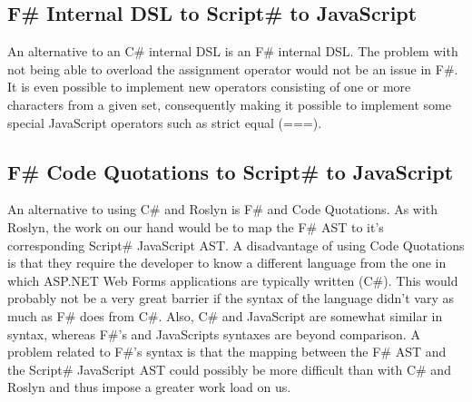 	
		\subsection{F\# Internal DSL to Script\# to JavaScript} %
		\label{ssub:f_internal_dsl_to_script_to_javascript}
			An alternative to an C\# internal DSL is an F\# internal DSL. The problem with not being able to overload the assignment operator would not be an issue in F\#. It is even possible to implement new operators consisting of one or more characters from a given set, consequently making it possible to implement some special JavaScript operators such as strict equal (===).

		\subsection{F\# Code Quotations to Script\# to JavaScript} %
		\label{ssub:f_code_quotations_to_script_to_javascript}
			An alternative to using C\# and Roslyn is F\# and Code Quotations. As with Roslyn, the work on our hand would be to map the F\# AST to it's corresponding Script\# JavaScript AST. A disadvantage of using Code Quotations is that they require the developer to know a different language from the one in which ASP.NET Web Forms applications are typically written (C\#). This would probably not be a very great barrier if the syntax of the language didn't vary as much as F\# does from C\#. Also, C\# and JavaScript are somewhat similar in syntax, whereas F\#'s and JavaScripts syntaxes are beyond comparison. A problem related to F\#'s syntax is that the mapping between the F\# AST and the Script\# JavaScript AST could possibly be more difficult than with C\# and Roslyn and thus impose a greater work load on us.

